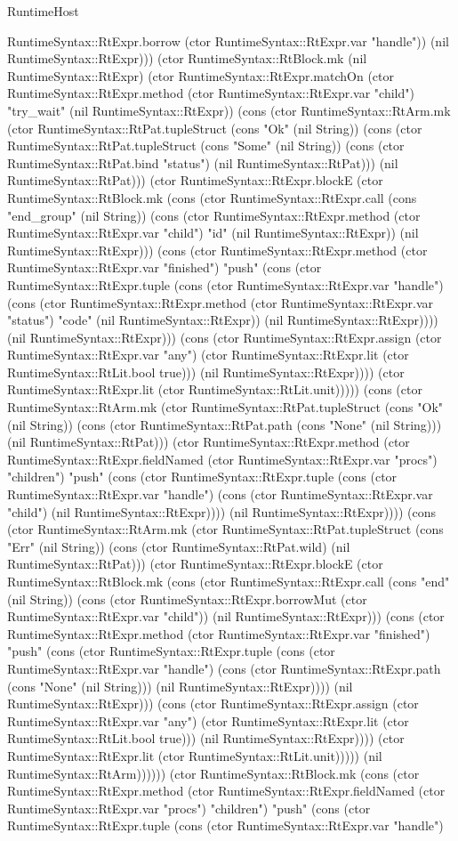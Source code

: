 \begin{lexlean}{RuntimeHost}
\begin{semanticmodule}
{RuntimeSyntax::RtExpr.borrow (ctor RuntimeSyntax::RtExpr.var "handle")) (nil RuntimeSyntax::RtExpr))) (ctor RuntimeSyntax::RtBlock.mk (nil RuntimeSyntax::RtExpr) (ctor RuntimeSyntax::RtExpr.matchOn (ctor RuntimeSyntax::RtExpr.method (ctor RuntimeSyntax::RtExpr.var "child") "try_wait" (nil RuntimeSyntax::RtExpr)) (cons (ctor RuntimeSyntax::RtArm.mk (ctor RuntimeSyntax::RtPat.tupleStruct (cons "Ok" (nil String)) (cons (ctor RuntimeSyntax::RtPat.tupleStruct (cons "Some" (nil String)) (cons (ctor RuntimeSyntax::RtPat.bind "status") (nil RuntimeSyntax::RtPat))) (nil RuntimeSyntax::RtPat))) (ctor RuntimeSyntax::RtExpr.blockE (ctor RuntimeSyntax::RtBlock.mk (cons (ctor RuntimeSyntax::RtExpr.call (cons "end_group" (nil String)) (cons (ctor RuntimeSyntax::RtExpr.method (ctor RuntimeSyntax::RtExpr.var "child") "id" (nil RuntimeSyntax::RtExpr)) (nil RuntimeSyntax::RtExpr))) (cons (ctor RuntimeSyntax::RtExpr.method (ctor RuntimeSyntax::RtExpr.var "finished") "push" (cons (ctor RuntimeSyntax::RtExpr.tuple (cons (ctor RuntimeSyntax::RtExpr.var "handle") (cons (ctor RuntimeSyntax::RtExpr.method (ctor RuntimeSyntax::RtExpr.var "status") "code" (nil RuntimeSyntax::RtExpr)) (nil RuntimeSyntax::RtExpr)))) (nil RuntimeSyntax::RtExpr))) (cons (ctor RuntimeSyntax::RtExpr.assign (ctor RuntimeSyntax::RtExpr.var "any") (ctor RuntimeSyntax::RtExpr.lit (ctor RuntimeSyntax::RtLit.bool true))) (nil RuntimeSyntax::RtExpr)))) (ctor RuntimeSyntax::RtExpr.lit (ctor RuntimeSyntax::RtLit.unit))))) (cons (ctor RuntimeSyntax::RtArm.mk (ctor RuntimeSyntax::RtPat.tupleStruct (cons "Ok" (nil String)) (cons (ctor RuntimeSyntax::RtPat.path (cons "None" (nil String))) (nil RuntimeSyntax::RtPat))) (ctor RuntimeSyntax::RtExpr.method (ctor RuntimeSyntax::RtExpr.fieldNamed (ctor RuntimeSyntax::RtExpr.var "procs") "children") "push" (cons (ctor RuntimeSyntax::RtExpr.tuple (cons (ctor RuntimeSyntax::RtExpr.var "handle") (cons (ctor RuntimeSyntax::RtExpr.var "child") (nil RuntimeSyntax::RtExpr)))) (nil RuntimeSyntax::RtExpr)))) (cons (ctor RuntimeSyntax::RtArm.mk (ctor RuntimeSyntax::RtPat.tupleStruct (cons "Err" (nil String)) (cons (ctor RuntimeSyntax::RtPat.wild) (nil RuntimeSyntax::RtPat))) (ctor RuntimeSyntax::RtExpr.blockE (ctor RuntimeSyntax::RtBlock.mk (cons (ctor RuntimeSyntax::RtExpr.call (cons "end" (nil String)) (cons (ctor RuntimeSyntax::RtExpr.borrowMut (ctor RuntimeSyntax::RtExpr.var "child")) (nil RuntimeSyntax::RtExpr))) (cons (ctor RuntimeSyntax::RtExpr.method (ctor RuntimeSyntax::RtExpr.var "finished") "push" (cons (ctor RuntimeSyntax::RtExpr.tuple (cons (ctor RuntimeSyntax::RtExpr.var "handle") (cons (ctor RuntimeSyntax::RtExpr.path (cons "None" (nil String))) (nil RuntimeSyntax::RtExpr)))) (nil RuntimeSyntax::RtExpr))) (cons (ctor RuntimeSyntax::RtExpr.assign (ctor RuntimeSyntax::RtExpr.var "any") (ctor RuntimeSyntax::RtExpr.lit (ctor RuntimeSyntax::RtLit.bool true))) (nil RuntimeSyntax::RtExpr)))) (ctor RuntimeSyntax::RtExpr.lit (ctor RuntimeSyntax::RtLit.unit))))) (nil RuntimeSyntax::RtArm)))))) (ctor RuntimeSyntax::RtBlock.mk (cons (ctor RuntimeSyntax::RtExpr.method (ctor RuntimeSyntax::RtExpr.fieldNamed (ctor RuntimeSyntax::RtExpr.var "procs") "children") "push" (cons (ctor RuntimeSyntax::RtExpr.tuple (cons (ctor RuntimeSyntax::RtExpr.var "handle") }
\end{semanticmodule}
\end{lexlean}
